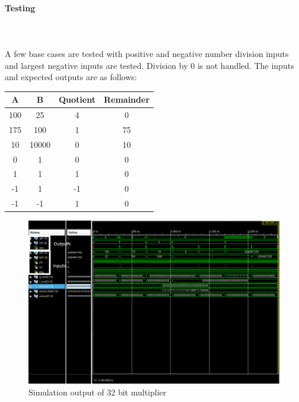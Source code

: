 \documentclass{article}
\begin{document}
    \paragraph{Testing}
    \hfill\\\\
    A few base cases are tested with positive and negative number
    division inputs and largest negative inputs are tested. Division by 0 is not
    handled. The inputs and expected
    outputs are as follows:

    \begin{center}
        \begin{tabular}{|c|c||c|c|}
            \hline
            A & B & Quotient & Remainder
            \\\hline\hline
            100 & 25 & 4 & 0
            \\\hline
            175 & 100 & 1 & 75
            \\\hline
            10 & 10000 & 0 & 10
            \\\hline
            0 & 1 & 0 & 0
            \\\hline
            1 & 1 & 1 & 0
            \\\hline
            -1 & 1 & -1 & 0
            \\\hline
            -1 & -1 & 1 & 0
            \\\hline
        \end{tabular}
    \end{center}


    \begin{figure}[H]
        \centering
        \includegraphics[width=0.9\paperwidth,center]{Screenshots/divider_32.png}
        \caption{Simulation output of 32 bit multiplier}
    \end{figure}
\end{document}
